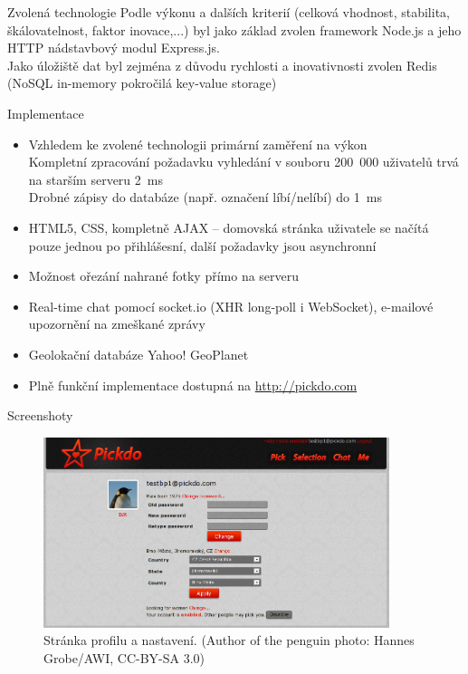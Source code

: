 \documentclass[xcolor=dvipsnames]{beamer}
\begin{document}
  \begin{frame}{Zvolená technologie}
  	Podle výkonu a dalších kriterií (celková vhodnost, stabilita, škálovatelnost, faktor inovace,...) byl jako základ zvolen framework Node.js a jeho HTTP nádstavbový modul Express.js. \\\bigskip
  	Jako úložiště dat byl zejména z důvodu rychlosti a inovativnosti zvolen Redis (NoSQL in-memory pokročilá key-value storage)
  \end{frame}
  \begin{frame}{Implementace}
    \begin{itemize}
    	\item Vzhledem ke zvolené technologii primární zaměření na výkon\\
    		Kompletní zpracování požadavku vyhledání v souboru 200~000 uživatelů trvá na starším serveru 2~ms\\
    		Drobné zápisy do databáze (např. označení líbí/nelíbí) do 1~ms
    	\item HTML5, CSS, kompletně AJAX -- domovská stránka uživatele se načítá pouze jednou po přihlášesní, další požadavky jsou asynchronní
    	\item Možnost ořezání nahrané fotky přímo na serveru
    	\item Real-time chat pomocí socket.io (XHR long-poll i WebSocket), e-mailové upozornění na zmeškané zprávy
    	\item Geolokační databáze Yahoo! GeoPlanet
    	\item Plně funkční implementace dostupná na \url{http://pickdo.com}
    \end{itemize}
  \end{frame}

  \begin{frame}{Screenshoty}
    \begin{figure}[h]
	  \centering
	    \includegraphics[width=0.9\textwidth]{../tex/screen-profile.png}
		  \caption{Stránka profilu a nastavení. (Author of the penguin photo: Hannes Grobe/AWI, CC-BY-SA 3.0)}
		  \label{fig:screen-profile}
	  \end{figure}
	\end{frame}
	
\end{document}
